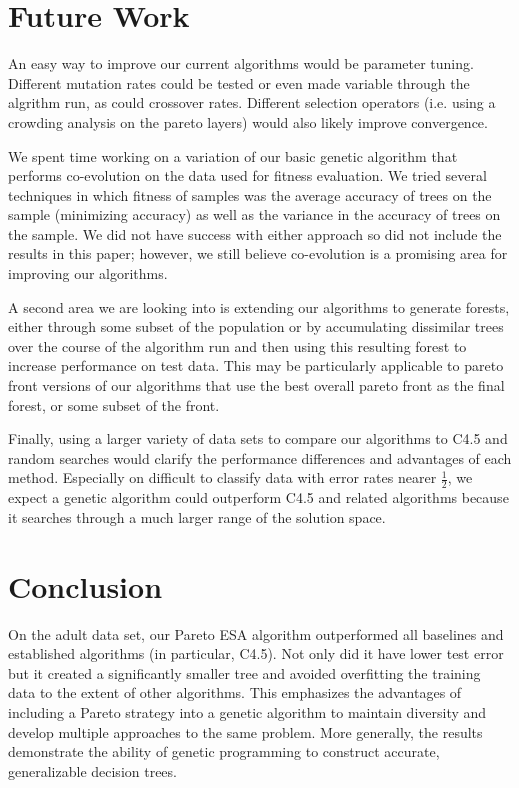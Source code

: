 \documentclass{acm_proc_article-sp}
\begin{document}
\section{Future Work}
An easy way to improve our current algorithms would be parameter tuning. Different mutation rates could be tested or even made variable through the algrithm run, as could crossover rates. Different selection operators (i.e. using a crowding analysis on the pareto layers) would also likely improve convergence.

We spent time working on a variation of our basic genetic algorithm that performs co-evolution on the data used for fitness evaluation. We tried several techniques in which fitness of samples was the average accuracy of trees on the sample (minimizing accuracy) as well as the variance in the accuracy of trees on the sample. We did not have success with either approach so did not include the results in this paper; however, we still believe co-evolution is a promising area for improving our algorithms.

A second area we are looking into is extending our algorithms to generate forests, either through some subset of the population or by accumulating dissimilar trees over the course of the algorithm run and then using this resulting forest to increase performance on test data. This may be particularly applicable to pareto front versions of our algorithms that use the best overall pareto front as the final forest, or some subset of the front.

Finally, using a larger variety of data sets to compare our algorithms to C4.5 and random searches would clarify the performance differences and advantages of each method. Especially on difficult to classify data with error rates nearer $\frac{1}{2}$, we expect a genetic algorithm could outperform C4.5 and related algorithms because it searches through a much larger range of the solution space.

\section{Conclusion}

On the adult data set, our Pareto ESA algorithm outperformed all baselines and established algorithms (in particular, C4.5). Not only did it have lower test error but it created a significantly smaller tree and avoided overfitting the training data to the extent of other algorithms. This emphasizes the advantages of including a Pareto strategy into a genetic algorithm to maintain diversity and develop multiple approaches to the same problem. More generally, the results demonstrate the ability of genetic programming to construct accurate, generalizable decision trees.
\end{document}
